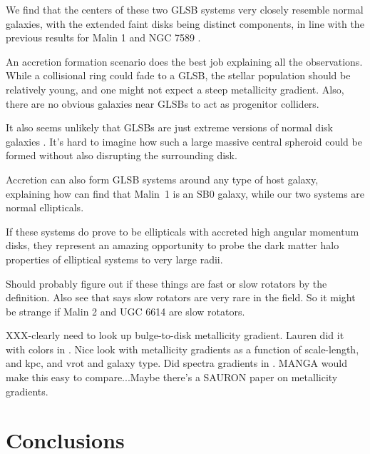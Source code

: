 \documentclass[12pt,preprint]{aastex}
\begin{document}
We find that the centers of these two GLSB systems very closely resemble normal galaxies, with the extended faint disks being distinct components, in line with the previous results for Malin 1 \citep{Barth07} and NGC 7589 \citep{Lelli10}. 

An accretion formation scenario does the best job explaining all the observations.  While a collisional ring could fade to a GLSB, the stellar population should be relatively young, and one might not expect a steep metallicity gradient.  Also, there are no obvious galaxies near GLSBs to act as progenitor colliders.  

It also seems unlikely that GLSBs are just extreme versions of normal disk galaxies \citep{Das13}.  It's hard to imagine how such a large massive central spheroid could be formed without also disrupting the surrounding disk.

Accretion can also form GLSB systems around any type of host galaxy, explaining how \citet{Barth07} can find that Malin~1 is an SB0 galaxy, while our two systems are normal ellipticals.


If these systems do prove to be ellipticals with accreted high angular momentum disks, they represent an amazing opportunity to probe the dark matter halo properties of elliptical systems to very large radii.

Should probably figure out if these things are fast or slow rotators by the \citet{Emsell11} definition.  Also see \citet{Capp11} that says slow rotators are very rare in the field.  So it might be strange if Malin 2 and UGC 6614 are slow rotators. 

XXX-clearly need to look up bulge-to-disk metallicity gradient.  Lauren did it with colors in \citet{MacArthur04}.  Nice look with metallicity gradients as a function of scale-length, and kpc, and vrot and galaxy type.  Did spectra gradients in \citet{MacArthur09}.  MANGA would make this easy to compare...Maybe there's a SAURON paper on metallicity gradients.


\section{Conclusions}
\end{document}
